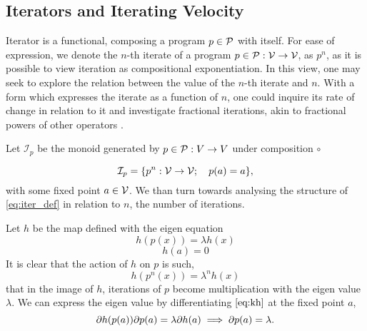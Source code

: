 \subsection{Iterators and Iterating Velocity}
 

  Iterator is a functional, composing a program $p\in\mathcal{P}$ with itself. For ease of expression, we denote the $n$-th iterate of a program $p\in\mathcal{P}:\mathcal{V}\to \mathcal{V}$, as $p^n$, as it is possible to view iteration as compositional exponentiation. In this view, one may seek to explore the relation between the value of the $n$-th iterate and $n$. With a form which expresses the iterate as a function of $n$, one could inquire its rate of change in relation to it and investigate fractional iterations, akin to fractional powers of other operators \cite{komatsu1966fractional}.
  
Let $\mathcal{I}_p$ be the monoid generated by $p\in\mathcal{P}:V\to V$ under composition $\circ$
  
  \begin{equation}\label{eq:iter_def}
  \mathcal{I}_p=\{p^n:\mathcal{V}\to \mathcal{V};\quad p(a)=a\},
  \end{equation}
 with some fixed point $a\in \mathcal{V}$. We than turn towards analysing the structure of \eqref{eq:iter_def} in relation to $n$, the number of iterations.

Let $h$ be the map defined with the eigen equation  
\begin{equation}\label{eq:kh}
  h(p(x))=\lambda h(x)
  \end{equation}
   \begin{equation}
   h(a)=0
   \end{equation}
It is clear that the action of $h$ on $p$ is such, 
  \begin{equation}
  h(p^n(x))=\lambda^nh(x)
  \end{equation}
that in the image of $h$, iterations of $p$ become multiplication with the eigen value $\lambda$. We can express the eigen value by differentiating $\eqref{eq:kh}$ at the fixed point $a$,
$$\partial h(p(a))\partial p(a)=\lambda\partial h(a)\implies\partial p(a)=\lambda.$$


